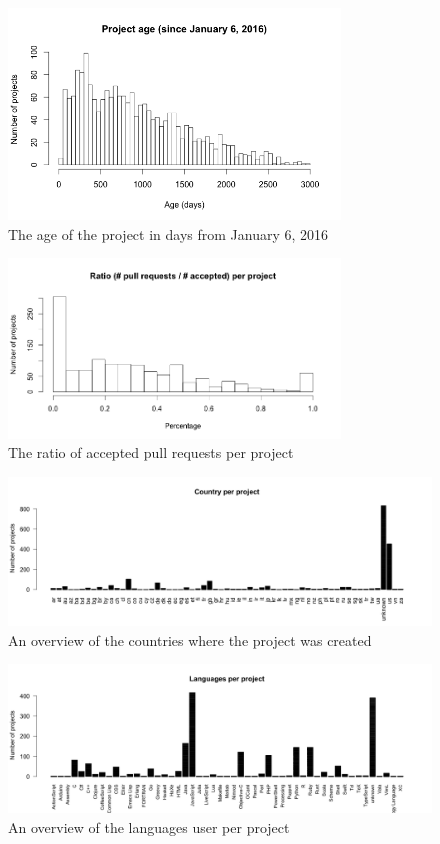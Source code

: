 	    \begin{figure}[h!]
	        \includegraphics[width=250pt]{figures/project-age}
	        \caption{The age of the project in days from January 6, 2016}
	        \label{fig:age-plot}
	    \end{figure}

	    \begin{figure}[h]
	        \includegraphics[width=250pt]{figures/ratio-pull-request-per-project}
	        \caption{The ratio of accepted pull requests per project}
	        \label{fig:ratio-pull-requests-plot}
	    \end{figure}

	    \begin{figure}[t!]
	        \includegraphics[width=500pt]{figures/country-per-project}
	        \caption{An overview of the countries where the project was created}
	        \label{fig:country-plot}
	    \end{figure}

	    \begin{figure}[t!]
	        \includegraphics[width=500pt]{figures/languages-per-project}
	        \caption{An overview of the languages user per project}
	        \label{fig:language-frequency-plot}
	    \end{figure}
    
